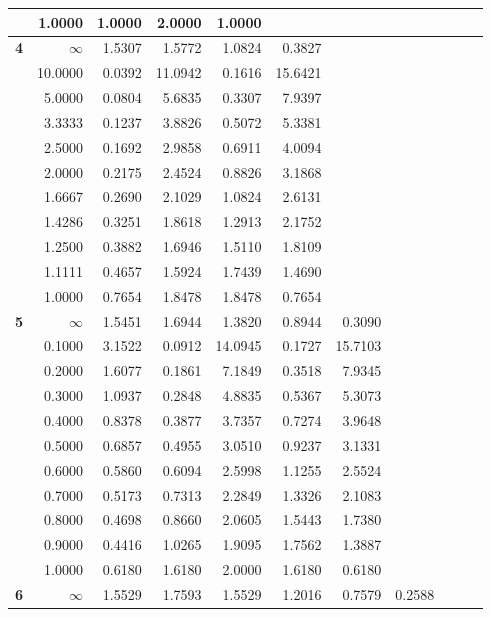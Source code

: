 \begin{table}[!htb]
\begin{center}
{\begin{tabular}{|c||r|r|r|r|r|r|r|r|r|r|}
&1.0000&1.0000&2.0000&1.0000&     &     &     &     &     &     \\ \hline
\textbf{ 4}&$\infty$&1.5307&1.5772&1.0824&0.3827&     &     &     &     &     \\
&10.0000&0.0392&11.0942&0.1616&15.6421&     &     &     &     &     \\
&5.0000&0.0804&5.6835&0.3307&7.9397&     &     &     &     &     \\
&3.3333&0.1237&3.8826&0.5072&5.3381&     &     &     &     &     \\
&2.5000&0.1692&2.9858&0.6911&4.0094&     &     &     &     &     \\
&2.0000&0.2175&2.4524&0.8826&3.1868&     &     &     &     &     \\
&1.6667&0.2690&2.1029&1.0824&2.6131&     &     &     &     &     \\
&1.4286&0.3251&1.8618&1.2913&2.1752&     &     &     &     &     \\
&1.2500&0.3882&1.6946&1.5110&1.8109&     &     &     &     &     \\
&1.1111&0.4657&1.5924&1.7439&1.4690&     &     &     &     &     \\
&1.0000&0.7654&1.8478&1.8478&0.7654&     &     &     &     &     \\ \hline
\textbf{ 5}&$\infty$&1.5451&1.6944&1.3820&0.8944&0.3090&     &     &     &     \\
&0.1000&3.1522&0.0912&14.0945&0.1727&15.7103&     &     &     &     \\
&0.2000&1.6077&0.1861&7.1849&0.3518&7.9345&     &     &     &     \\
&0.3000&1.0937&0.2848&4.8835&0.5367&5.3073&     &     &     &     \\
&0.4000&0.8378&0.3877&3.7357&0.7274&3.9648&     &     &     &     \\
&0.5000&0.6857&0.4955&3.0510&0.9237&3.1331&     &     &     &     \\
&0.6000&0.5860&0.6094&2.5998&1.1255&2.5524&     &     &     &     \\
&0.7000&0.5173&0.7313&2.2849&1.3326&2.1083&     &     &     &     \\
&0.8000&0.4698&0.8660&2.0605&1.5443&1.7380&     &     &     &     \\
&0.9000&0.4416&1.0265&1.9095&1.7562&1.3887&     &     &     &     \\
&1.0000&0.6180&1.6180&2.0000&1.6180&0.6180&     &     &     &     \\ \hline
\textbf{ 6}&$\infty$&1.5529&1.7593&1.5529&1.2016&0.7579&0.2588&     &     &     \\

\end{tabular}}
\end{center}
\end{table}
